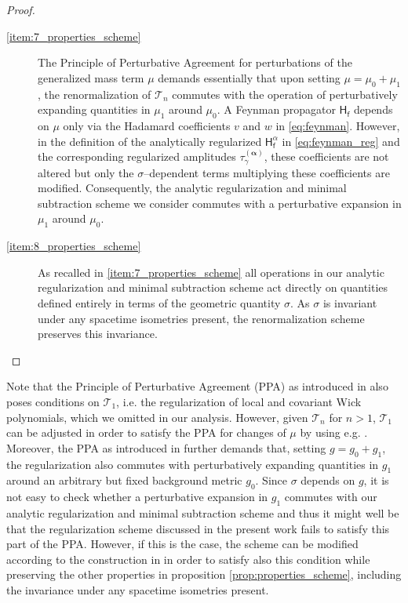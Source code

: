 \documentclass[11pt]{book}
\newcommand{\alphabd}{\boldsymbol{\alpha}}
\newcommand{\Tcal}{\mathcal{T}}
\newcommand{\Hsf}{\mathsf{H}}
\newcommand{\fsf}{\mathsf{f}}
\theoremstyle{break}
\begin{document}
\begin{proof}
\begin{description}
\item[\ref{item:7_properties_scheme}] The Principle of Perturbative Agreement for perturbations of the generalized mass term $\mu$ demands essentially that upon setting $\mu=\mu_0 + \mu_1$, the renormalization of $\Tcal_n$ commutes with the operation of perturbatively expanding quantities in $\mu_1$ around $\mu_0$. A Feynman propagator $\Hsf_\fsf$ depends on $\mu$ only via the Hadamard coefficients $v$ and $w$ in \eqref{eq:feynman}. However, in the definition of the analytically regularized $\Hsf^{\alpha}_\fsf$ in \eqref{eq:feynman_reg} and the corresponding regularized amplitudes $\tau^{(\alphabd)}_\gamma$, these coefficients are not altered but only the $\sigma$--dependent terms multiplying these coefficients are modified. Consequently, the analytic regularization and minimal subtraction scheme we consider commutes with a perturbative expansion in $\mu_1$ around $\mu_0$.
%
%
%
%
\item[\ref{item:8_properties_scheme}] As recalled in \ref{item:7_properties_scheme} all operations in our analytic regularization and minimal subtraction scheme act directly on quantities defined entirely in terms of the geometric quantity $\sigma$. As $\sigma$ is invariant under any spacetime isometries present, the renormalization scheme preserves this invariance.
%
%
%
%
\end{description}
\end{proof}


Note that the Principle of Perturbative Agreement (PPA) as introduced in \cite{hollands_conservation_2005} also poses conditions on $\Tcal_1$, i.e. the regularization of local and covariant Wick polynomials, which we omitted in our analysis. However, given $\Tcal_n$ for $n>1$, $\Tcal_1$ can be adjusted in order to satisfy the PPA for changes of $\mu$ by using e.g. \cite[Theorem 3.3]{drago_generalised_2015}. Moreover, the PPA as introduced in \cite{hollands_conservation_2005} further demands that, setting $g = g_0 + g_1$, the regularization also commutes with perturbatively expanding quantities in $g_1$ around an arbitrary but fixed background metric $g_0$. Since $\sigma$ depends on $g$, it is not easy to check whether a perturbative expansion in $g_1$ commutes with our analytic regularization and minimal subtraction scheme and thus it might well be that the regularization scheme discussed in the present work fails to satisfy this part of the PPA. However, if this is the case, 
the scheme can be modified according to the construction in \cite{hollands_conservation_2005}
in order to satisfy also this condition while preserving the other properties in proposition \ref{prop:properties_scheme}, including the invariance under any spacetime isometries present.
\end{document}
